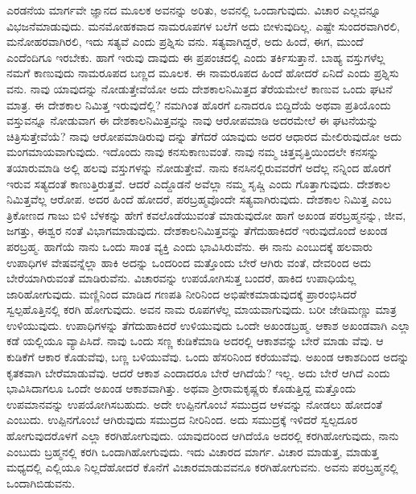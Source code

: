 ಎರಡನೆಯ ಮಾರ್ಗವೇ ಜ್ಞಾನದ ಮೂಲಕ ಅವನನ್ನು ಅರಿತು, ಅವನಲ್ಲಿ ಒಂದಾಗುವುದು. ವಿಚಾರ ಎಲ್ಲವನ್ನೂ ವಿಭಜನೆಮಾಡುವುದು. ಮನಮೋಹಕವಾದ ನಾಮರೂಪಗಳ ಬಲೆಗೆ ಅದು ಬೀಳುವುದಿಲ್ಲ. ಎಷ್ಟೇ ಸುಂದರವಾಗಿರಲಿ, ಮನೋಹರವಾಗಿರಲಿ, ಇದು ಸತ್ಯವೆ ಎಂದು ಪ್ರಶ್ನಿಸು ವನು. ಸತ್ಯವಾಗಿದ್ದರೆ, ಅದು ಹಿಂದೆ, ಈಗ, ಮುಂದೆ ಎಂದೆಂದಿಗೂ ಇರಬೇಕು. ಹಾಗೆ ಇರುವು ದಾವುದು ಈ ಪ್ರಪಂಚದಲ್ಲಿ ಎಂದು ತರ್ಕಿಸುತ್ತಾನೆ. ಬಾಹ್ಯ ವಸ್ತುಗಳೆಲ್ಲ ನಮಗೆ ಕಾಣುವುದು ನಾಮರೂಪದ ಬಣ್ಣದ ಮೂಲಕ. ಈ ನಾಮರೂಪದ ಹಿಂದೆ ಹೋದರೆ ಏನಿದೆ ಎಂದು ಪ್ರಶ್ನಿಸು ವನು. ನಾವು ಯಾವುದನ್ನು ನೋಡುತ್ತೇವೆಯೋ ಅದು ದೇಶಕಾಲನಿಮಿತ್ತದ ತೆರೆಯಮೇಲೆ ಕಾಣುವ ಒಂದು ಘಟನೆ ಮಾತ್ರ. ಈ ದೇಶಕಾಲ ನಿಮಿತ್ತ ಇರುವುದೆಲ್ಲಿ? ನಮಗಿಂತ ಹೊರಗೆ ಏನಾದರೂ ಬಿದ್ದಿದೆಯೆ ಅಥವಾ ಪ್ರತಿಯೊಂದು ವಸ್ತುವನ್ನೂ ನೋಡುವಾಗ ಈ ದೇಶಕಾಲನಿಮಿತ್ತವನ್ನು ನಾವು ಆರೋಪಮಾಡಿ ಅದರಮೇಲೆ ಈ ಘಟನೆಯನ್ನು ಚಿತ್ರಿಸುತ್ತೇವೆಯೆ? ನಾವು ಆರೋಪಮಾಡಿರುವು ದನ್ನು ತೆಗೆದರೆ ಯಾವುದು ಅದರ ಆಧಾರದ ಮೇಲಿರುವುದೋ ಅದು ಮಂಗಮಾಯವಾಗುವುದು. ಇದೊಂದು ನಾವು ಕನಸುಕಾಣುವಂತೆ. ನಾವು ನಮ್ಮ ಚಿತ್ತವೃತ್ತಿಯಿಂದಲೇ ಕನಸನ್ನು ತಯಾರುಮಾಡಿ ಅಲ್ಲಿ ಹಲವು ವಸ್ತುಗಳನ್ನು ನೋಡುತ್ತೇವೆ. ನಾನು ಕನಸಿನಲ್ಲಿರುವವರೆಗೆ ಅದೆಲ್ಲ ನನ್ನಿಂದ ಹೊರಗೆ ಇರುವ ಸತ್ಯದಂತೆ ಕಾಣುತ್ತಿರುತ್ತವೆ. ಆದರೆ ಎದ್ದೊಡನೆ ಅವೆಲ್ಲಾ ನಮ್ಮ ಸೃಷ್ಚಿ ಎಂದು ಗೊತ್ತಾಗುವುದು. ದೇಶಕಾಲ ನಿಮಿತ್ತವೆಲ್ಲ ಆರೋಪ. ಅದರ ಹಿಂದೆ ಹೋದರೆ, ಪರಬ್ರಹ್ಮವೊಂದೇ ಸತ್ಯವಾಗಿರುವುದು. ದೇಶಕಾಲ ನಿಮಿತ್ತ ಎಂಬ ತ್ರಿಕೋಣದ ಗಾಜು ಬಿಳಿ ಬೆಳಕನ್ನು ಹೇಗೆ ಕವಲೊಡೆಯುವಂತೆ ಮಾಡುವುದೋ ಹಾಗೆ ಅಖಂಡ ಪರಬ್ರಹ್ಮನನ್ನು, ಜೀವ, ಜಗತ್ತು, ಈಶ್ವರ ನಂತೆ ವಿಭಾಗಮಾಡುವುದು. ದೇಶಕಾಲನಿಮಿತ್ತವನ್ನು ತೆಗೆದುಹಾಕಿದರೆ ಇರುವುದೊಂದೆ ಅಖಂಡ ಪರಬ್ರಹ್ಮ. ಹಾಗೆಯೆ ನಾನು ಒಂದು ಸಾಂತ ವ್ಯಕ್ತಿ ಎಂದು ಭಾವಿಸಿರುವೆನು. ಈ ನಾನು ಎಂಬುದಕ್ಕೆ ಹಲವಾರು ಉಪಾಧಿಗಳ ವೇಷವನ್ನೆಲ್ಲಾ ಹಾಕಿ ಅದನ್ನು ಒಂದರಿಂದ ಮತ್ತೊಂದು ಬೇರೆ ಆಗಿರು ವಂತೆ, ದೇವರಿಂದ ಅದು ಬೇರೆಯಾಗಿರುವಂತೆ ಮಾಡಿರುವೆನು. ವಿಚಾರವನ್ನು ಉಪಯೋಗಿಸುತ್ತ ಬಂದರೆ, ಹಾಕಿದ ಉಪಾಧಿಯೆಲ್ಲ ಜಾರಿಹೋಗುವುದು. ಮಣ್ಣಿನಿಂದ ಮಾಡಿದ ಗಣಪತಿ ನೀರಿನಿಂದ ಅಭಿಷೇಕಮಾಡುವುದಕ್ಕೆ ಪ್ರಾರಂಭಿಸಿದರೆ ಸ್ವಲ್ಪಹೊತ್ತಿನಲ್ಲಿ ಕರಗಿ ಹೋಗುವುದು. ಅವನ ನಾಮ ರೂಪಗಳೆಲ್ಲ ಮಾಯವಾಗುವುದು. ಬರೀ ಜೇಡಿಮಣ್ಣು ಮಾತ್ರ ಉಳಿಯುವುದು. ಉಪಾಧಿಗಳನ್ನು ತೆಗೆದುಹಾಕಿದರೆ ಉಳಿಯುವುದು ಒಂದೇ ಅಖಂಡಬ್ರಹ್ಮ. ಆಕಾಶ ಅಖಂಡವಾಗಿ ಎಲ್ಲಾ ಕಡೆ ಯಲ್ಲಿಯೂ ವ್ಯಾಪಿಸಿದೆ. ನಾವು ಒಂದು ಸಣ್ಣ ಕುಡಿಕೆಮಾಡಿ ಅದರಲ್ಲಿ ಆಕಾಶವನ್ನು ಬೇರೆ ಮಾಡು ವೆವು. ಆ ಕುಡಿಕೆಗೆ ಆಕಾರ ಕೊಡುವೆವು, ಬಣ್ಣ ಬಳಿಯುವೆವು. ಒಂದು ಹೆಸರಿನಿಂದ ಕರೆಯುವೆವು. ಅಖಂಡ ಆಕಾಶದಿಂದ ಅದನ್ನು ಕೃತಕವಾಗಿ ಬೇರೆಮಾಡುವೆವು. ಆದರೆ ಆಕಾಶ ಎಂದಾದರೂ ಬೇರೆ ಆಗಿದೆಯೆ? ಇಲ್ಲ. ಅದು ಬೇರೆ ಆಗಿದೆ ಎಂದು ಭಾವಿಸಿದಾಗಲೂ ಒಂದೇ ಅಖಂಡ ಆಕಾಶವಾಗಿತ್ತು. ಅಥವಾ ಶ್ರೀರಾಮಕೃಷ್ಣರು ಕೊಡುತ್ತಿದ್ದ ಮತ್ತೊಂದು ಉಪಮಾನವನ್ನು ಉಪಯೋಗಿಸಬಹುದು. ಅದೇ ಉಪ್ಪಿನಗೊಂಬೆ ಸಮುದ್ರದ ಆಳವನ್ನು ನೋಡಲು ಹೋದಂತೆ ಎಂಬುದು. ಉಪ್ಪಿನಗೊಂಬೆ ಆಗಿರುವುದು ಸಮುದ್ರದ ನೀರಿನಿಂದ. ಅದು ಸಮುದ್ರಕ್ಕೆ ಇಳಿದರೆ ಸ್ವಲ್ಪದೂರ ಹೋಗುವುದರೊಳಗೆ ಎಲ್ಲಾ ಕರಗಿಹೋಗುವುದು. ಯಾವುದರಿಂದ ಆಗಿದೆಯೊ ಅದರಲ್ಲಿ ಕರಗಿಹೋಗುವುದು, ನಾನು ಎಂಬುದು ಬ್ರಹ್ಮನಲ್ಲಿ ಕರಗಿ ಒಂದಾಗಿಹೋಗುವುದು. ಇದು ವಿಚಾರದ ಮಾರ್ಗ. ವಿಚಾರ ಮಾಡುತ್ತ, ಮಾಡುತ್ತ ಮಧ್ಯದಲ್ಲಿ ಎಲ್ಲಿಯೂ ನಿಲ್ಲದೆಹೋದರೆ ಕೊನೆಗೆ ವಿಚಾರಮಾಡುವವನೂ ಕರಗಿಹೋಗುವನು. ಅವನು ಪರಬ್ರಹ್ಮನಲ್ಲಿ ಒಂದಾಗಿಬಿಡುವನು.

